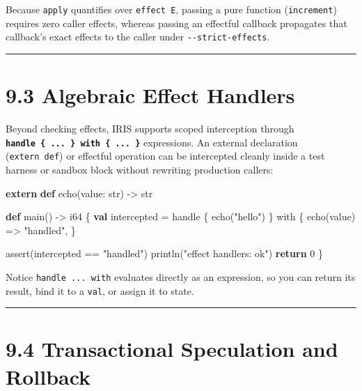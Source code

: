 \documentclass[
  english,
  oneside]{book}
\newenvironment{Shaded}{\begin{snugshade}}{\end{snugshade}}
\newcommand{\ControlFlowTok}[1]{\textcolor[rgb]{0.77,0.53,0.75}{\textbf{#1}}}
\newcommand{\DataTypeTok}[1]{\textcolor[rgb]{0.31,0.79,0.69}{#1}}
\newcommand{\DecValTok}[1]{\textcolor[rgb]{0.71,0.81,0.66}{#1}}
\newcommand{\FunctionTok}[1]{\textcolor[rgb]{0.86,0.86,0.67}{#1}}
\newcommand{\KeywordTok}[1]{\textcolor[rgb]{0.34,0.61,0.84}{\textbf{#1}}}
\newcommand{\NormalTok}[1]{\textcolor[rgb]{0.83,0.83,0.83}{#1}}
\newcommand{\OperatorTok}[1]{\textcolor[rgb]{0.83,0.83,0.83}{#1}}
\newcommand{\StringTok}[1]{\textcolor[rgb]{0.81,0.57,0.47}{#1}}
\begin{document}
Because \texttt{apply} quantifies over \texttt{effect\ E}, passing a
pure function (\texttt{increment}) requires zero caller effects, whereas
passing an effectful callback propagates that callback's exact effects
to the caller under \texttt{-\/-strict-effects}.

\begin{center}\rule{0.5\linewidth}{0.5pt}\end{center}

\section{9.3 Algebraic Effect Handlers}\label{algebraic-effect-handlers}

Beyond checking effects, IRIS supports scoped interception through
\textbf{\texttt{handle\ \{\ ...\ \}\ with\ \{\ ...\ \}}} expressions. An
external declaration (\texttt{extern\ def}) or effectful operation can
be intercepted cleanly inside a test harness or sandbox block without
rewriting production callers:

\begin{Shaded}
\begin{Highlighting}[]
\KeywordTok{extern} \KeywordTok{def}\NormalTok{ echo(value: }\DataTypeTok{str}\NormalTok{) }\OperatorTok{{-}\textgreater{}} \DataTypeTok{str}

\KeywordTok{def}\NormalTok{ main() }\OperatorTok{{-}\textgreater{}} \DataTypeTok{i64}\NormalTok{ \{}
    \KeywordTok{val}\NormalTok{ intercepted }\OperatorTok{=}\NormalTok{ handle \{}
\NormalTok{        echo(}\StringTok{"hello"}\NormalTok{)}
\NormalTok{    \} with \{}
\NormalTok{        echo(value) }\OperatorTok{=\textgreater{}} \StringTok{"handled"}\NormalTok{,}
\NormalTok{    \}}

    \FunctionTok{assert}\NormalTok{(intercepted }\OperatorTok{==} \StringTok{"handled"}\NormalTok{)}
\NormalTok{    println(}\StringTok{"effect handlers: ok"}\NormalTok{)}
    \ControlFlowTok{return} \DecValTok{0}
\NormalTok{\}}
\end{Highlighting}
\end{Shaded}

Notice \texttt{handle\ ...\ with} evaluates directly as an expression,
so you can return its result, bind it to a \texttt{val}, or assign it to
state.

\begin{center}\rule{0.5\linewidth}{0.5pt}\end{center}

\section{9.4 Transactional Speculation and
Rollback}\label{transactional-speculation-and-rollback}
\end{document}
